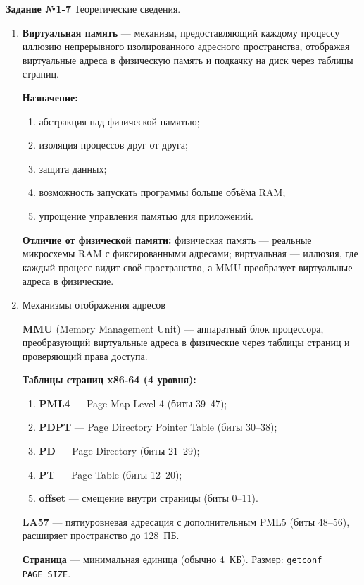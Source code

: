 \textbf{Задание №1-7} Теоретические сведения.\label{sec:1}

\begin{enumerate}

\item \textbf{Виртуальная память} — механизм, предоставляющий каждому процессу
иллюзию непрерывного изолированного адресного пространства, отображая
виртуальные адреса в физическую память и подкачку на диск через таблицы
страниц.

\textbf{Назначение:}
\begin{enumerate}
    \item абстракция над физической памятью;
    \item изоляция процессов друг от друга;
    \item защита данных;
    \item возможность запускать программы больше объёма RAM;
    \item упрощение управления памятью для приложений.
\end{enumerate}

\textbf{Отличие от физической памяти:}
физическая память — реальные микросхемы RAM с фиксированными адресами;
виртуальная — иллюзия, где каждый процесс видит своё пространство, а MMU
преобразует виртуальные адреса в физические.


\item Механизмы отображения адресов \label{sec:2}

\textbf{MMU} (Memory Management Unit) — аппаратный блок процессора,
преобразующий виртуальные адреса в физические через таблицы страниц и
проверяющий права доступа.

\textbf{Таблицы страниц x86-64 (4 уровня):}
\begin{enumerate}
    \item \textbf{PML4} — Page Map Level 4 (биты 39--47);
    \item \textbf{PDPT} — Page Directory Pointer Table (биты 30--38);
    \item \textbf{PD} — Page Directory (биты 21--29);
    \item \textbf{PT} — Page Table (биты 12--20);
    \item \textbf{offset} — смещение внутри страницы (биты 0--11).
\end{enumerate}

\textbf{LA57} — пятиуровневая адресация с дополнительным PML5
(биты 48--56), расширяет пространство до 128~ПБ.

\textbf{Страница} — минимальная единица (обычно 4~КБ). Размер:
\texttt{getconf PAGE\_SIZE}.


\end{enumerate}
